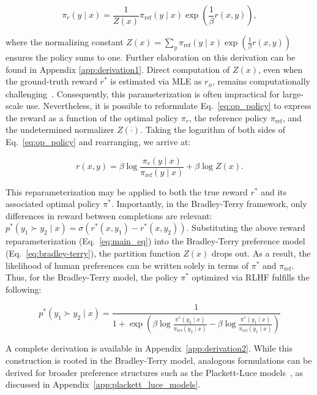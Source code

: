 \begin{equation}\label{eq:op_policy}
    \pi_r(y\mid x) = \frac{1}{Z(x)}\pi_\text{ref}(y\mid x)\exp\left(\frac{1}{\beta}r(x, y)\right),
\end{equation}

where the normalizing constant $Z(x) =\sum_{y}\pi_\text{ref}(y\mid x)\exp\left(\frac{1}{\beta}r(x, y)\right)$ ensures the policy sums to one. Further elaboration on this derivation can be found in Appendix \ref{app:derivation1}. Direct computation of $Z(x)$, even when the ground-truth reward $r^*$ is estimated via MLE as $r_{\phi}$, remains computationally challenging~\citep{korbak2022reinforcement, go2023aligning}. Consequently, this parameterization is often impractical for large-scale use. Nevertheless, it is possible to reformulate Eq.~\ref{eq:op_policy} to express the reward as a function of the optimal policy $\pi_r$, the reference policy $\pi_\text{ref}$, and the undetermined normalizer $Z(\cdot)$. Taking the logarithm of both sides of Eq.~\ref{eq:op_policy} and rearranging, we arrive at:

\begin{equation}\label{eq:main_eq}
    r(x,y) =\beta \log \frac{\pi_r(y\mid x)}{\pi_\text{ref}(y\mid x)} + \beta \log Z(x).
\end{equation}

This reparameterization may be applied to both the true reward $r^*$ and its associated optimal policy $\pi^*$. Importantly, in the Bradley-Terry framework, only differences in reward between completions are relevant: ${p^*(y_1 \succ y_2 \mid x) = \sigma(r^*(x, y_1) - r^*(x, y_2))}$. Substituting the above reward reparameterization (Eq.~\ref{eq:main_eq}) into the Bradley-Terry preference model (Eq.~\ref{eq:bradley-terry}), the partition function $Z(x)$ drops out. As a result, the likelihood of human preferences can be written solely in terms of $\pi^*$ and $\pi_\text{ref}$. Thus, for the Bradley-Terry model, the policy $\pi^*$ optimized via RLHF fulfills the following:

\begin{equation}\label{eq:objective}
    p^*(y_1\succ y_2 \mid x)=\frac{1}{1 + \exp\left(\beta \log \frac{\pi^*(y_2\mid x)}{\pi_\text{ref}(y_2\mid x)} - \beta \log \frac{\pi^*(y_1\mid x)}{\pi_\text{ref}(y_1\mid x)}\right)}
\end{equation}

A complete derivation is available in Appendix~\ref{app:derivation2}. While this construction is rooted in the Bradley-Terry model, analogous formulations can be derived for broader preference structures such as the Plackett-Luce models~\citep{plackett1975analysis, luce2012individual}, as discussed in Appendix~\ref{app:plackett_luce_models}.

